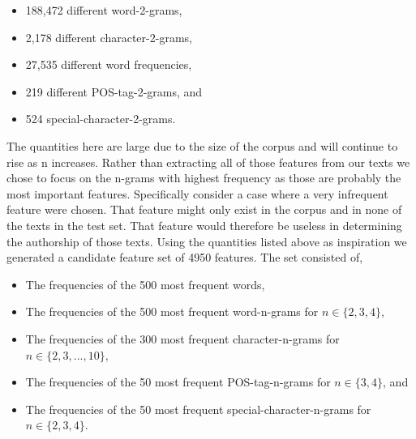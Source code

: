 \begin{itemize}
    \item 188,472 different word-2-grams,
    \item 2,178 different character-2-grams,
    \item 27,535 different word frequencies,
    \item 219 different \gls{POS}-tag-2-grams, and
    \item 524 special-character-2-grams.
\end{itemize}

The quantities here are large due to the size of the corpus and will continue
to rise as n increases. Rather than extracting all of those features from our
texts we chose to focus on the n-grams with highest frequency as those are
probably the most important features. Specifically consider a case where a very
infrequent feature were chosen. That feature might only exist in the corpus and
in none of the texts in the test set. That feature would therefore be useless
in determining the authorship of those texts. Using the quantities listed above
as inspiration we generated a candidate feature set of 4950 features. The set
consisted of,

\begin{itemize}
    \item

        The frequencies of the 500 most frequent words,

    \item

        The frequencies of the 500 most frequent word-n-grams for $n \in \{2, 3,
        4\}$,

    \item

        The frequencies of the 300 most frequent character-n-grams for $n \in
        \{2, 3, ..., 10\}$,

    \item

        The frequencies of the 50 most frequent \gls{POS}-tag-n-grams for $n \in
        \{3, 4\}$, and

    \item

        The frequencies of the 50 most frequent special-character-n-grams for $n
        \in \{2, 3, 4\}$.

\end{itemize}

